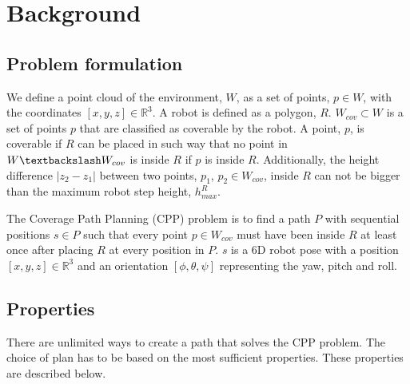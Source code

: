 


\chapter{Background}
\label{cha:background}

\section{Problem formulation}

We define a point cloud of the environment, $W$, as a set of points, $p \in W$, with the coordinates $[x, y, z] \in \mathbb{R}^{3}$. A robot is defined as a polygon, $R$. $W_{cov} \subset W$ is a set of points $p$ that are classified as coverable by the robot. A point, $p$, is coverable if $R$ can be placed in such way that no point in $W \textbackslash W_{cov}$ is inside $R$ if $p$ is inside $R$. Additionally, the height difference $|z_2 - z_1|$ between two points, $p_1$, $p_2 \in W_{cov}$, inside $R$ can not be bigger than the maximum robot step height, $h^R_{max}$.

The Coverage Path Planning (CPP) problem is to find a path $P$ with sequential positions $s \in P$ such that every point $p \in W_{cov}$ must have been inside $R$ at least once after placing $R$ at every position in $P$. $s$ is a 6D robot pose with a position $[x, y, z] \in \mathbb{R}^{3}$ and an orientation $[\phi, \theta, \psi]$ representing the yaw, pitch and roll.

\section{Properties}
There are unlimited ways to create a path that solves the CPP problem. The choice of plan has to be based on the most sufficient properties. These properties are described below.

